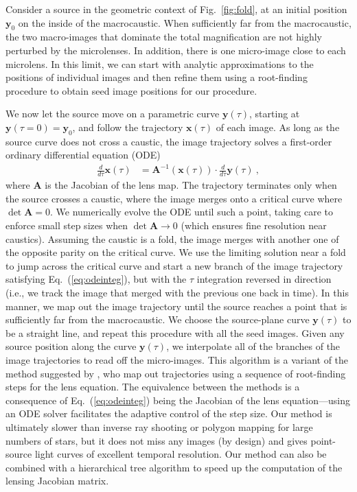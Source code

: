 \documentclass{aastex6}
\newcommand{\bt}[1]{\mathbf #1}
\newcommand{\refeq}[1]{Eq.~(\ref{eq:#1})}
\newcommand{\reffig}[1]{Fig.~\ref{fig:#1}}
\begin{document}
Consider a source in the geometric context of \reffig{fold}, at an initial position $\bt y_0$ on the inside of the macrocaustic. When sufficiently far from the macrocaustic, the two macro-images that dominate the total magnification are not highly perturbed by the microlenses. In addition, there is one micro-image close to each microlens. In this limit, we can start with analytic approximations to the positions of individual images and then refine them using a root-finding procedure to obtain seed image positions for our procedure. 

We now let the source move on a parametric curve $\bt y(\tau)$, starting at $\bt y(\tau = 0) = \bt y_0$, and follow the trajectory $\bt x(\tau)$ of each image. As long as the source curve does not cross a caustic, the image trajectory solves a first-order ordinary differential equation (ODE)
\begin{align}
\label{eq:odeinteg}
  \frac{d}{d\tau} {\bt x}(\tau) & = {\bt A}^{-1}(\bt x(\tau)) \cdot
 \frac{d}{d\tau} {\bt y}(\tau) ~,
\end{align}
where $\bt A$ is the Jacobian of the lens map. The trajectory terminates only when the source crosses a caustic, where the image merges onto a critical curve where $\det {\bt A} = 0$. We numerically evolve the ODE until such a point, taking care to enforce small step sizes when $\det {\bt A} \rightarrow 0$ (which ensures fine resolution near caustics). Assuming the caustic is a fold, the image merges with another one of the opposite parity on the critical curve. We use the limiting solution near a fold \citep{1986ApJ...310..568B} to jump across the critical curve and start a new branch of the image trajectory satisfying \refeq{odeinteg}, but with the $\tau$ integration reversed in direction (i.e., we track the image that merged with the previous one back in time). In this manner, we map out the image trajectory until the source reaches a point that is sufficiently far from the macrocaustic. 
We choose the source-plane curve $\bt y(\tau)$ to be a straight line, and repeat this procedure with all the seed images. Given any source position along the curve $\bt y(\tau)$, we interpolate all of the branches of the image trajectories to read off the micro-images. This algorithm is a variant of the method suggested by \cite{1993MNRAS.261..647L}, who map out trajectories using a sequence of root-finding steps for the lens equation. The equivalence between the methods is a consequence of \refeq{odeinteg} being the Jacobian of the lens equation---using an ODE solver facilitates the adaptive control of the step size. Our method is ultimately slower than inverse ray shooting or polygon mapping for large numbers of stars, but it does not miss any images (by design) and gives point-source light curves of excellent temporal resolution. Our method can also be combined with a hierarchical tree algorithm to speed up the computation of the lensing Jacobian matrix. 
\end{document}
